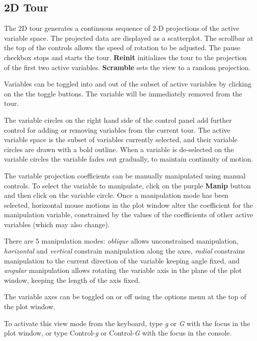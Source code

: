 \documentclass[11pt]{article}
\begin{document}
\subsection{2D Tour}
\label{slbl:2DTour}

The 2D tour generates a continuous sequence of 2-D projections of the
active variable space. The projected data are displayed as a
scatterplot. The scrollbar at the top of the controls allows the speed
of rotation to be adjusted. The pause checkbox stops and starts the
tour. {\bf Reinit} initializes the tour to the projection of the first two
active variables. {\bf Scramble} sets the view to a random projection.

Variables can be toggled into and out of the subset of active
variables by clicking on the the toggle buttons. The variable will be
immediately removed from the tour. 

The variable circles on the right hand side of the control panel add
further control for adding or removing variables from the current
tour. The active variable space is the subset of variables currently
selected, and their variable circles are drawn with a bold
outline. When a variable is de-selected on the variable circles the
variable fades out gradually, to maintain continuity of motion.

The variable projection coefficients can be manually manipulated using
manual controls. To select the variable to manipulate, click on the
purple {\bf Manip} button and then click on the variable circle. 
Once a manipulation mode has been selected,
horizontal mouse motions in the plot window alter the coefficient for
the manipulation variable, constrained by the values of the coefficients
of other active variables (which may also change).

There are 5 manipulation modes: {\it oblique} allows unconstrained
manipulation, {\it horizontal} and {\it vertical} constrain manipulation
along the axes, {\it radial} constrains manipulation to the current
direction of the variable keeping angle fixed, and {\it angular}
manipulation allows rotating the variable axis in the plane of the plot
window, keeping the length of the axis fixed.

The variable axes can be toggled on or off using the options menu at
the top of the plot window.

To activate this view mode from the keyboard, type {\em g} or {\em G}
with the focus in the plot window, or type Control-{\em g} or
Control-{\em G} with the focus in the console.
\end{document}
